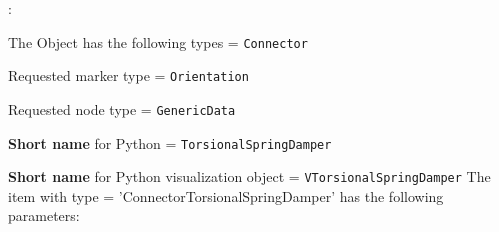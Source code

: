 \noindent {}:
\bi
  \item The Object has the following types = \texttt{Connector}
  \item Requested marker type = \texttt{Orientation}
  \item Requested node type = \texttt{GenericData}
  \item {\bf Short name} for Python = \texttt{TorsionalSpringDamper}
  \item {\bf Short name} for Python visualization object = \texttt{VTorsionalSpringDamper}
\ei\vspace{12pt} \noindent 
The item  with type = 'ConnectorTorsionalSpringDamper' has the following parameters:
\vspace{-0.5cm}\\
\vspace{-0.5cm}\\

